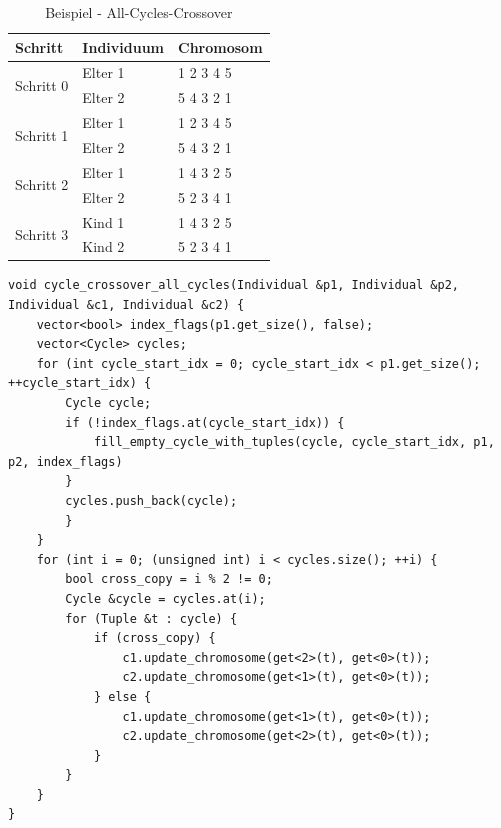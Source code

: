 \begin{table}[!htb]
\centering
\caption{Beispiel - All-Cycles-Crossover}
\begin{tabularx}{0.5\textwidth}{l|l|l}
Schritt & Individuum & Chromosom\\
\hline
\multirow{2}{*}{Schritt 0}
		& Elter 1 & 1 2 3 4 5\\
		& Elter 2 & 5 4 3 2 1\\
\hline
\multirow{2}{*}{Schritt 1}
		& Elter 1 & \color{green}1 \color{blue}2 \color{red}3 \color{blue}4 \color{green}5\\
		& Elter 2 &  \color{green}5 \color{blue}4 \color{red}3 \color{blue}2 \color{green}1\\
\hline
\multirow{2}{*}{Schritt 2}
		& Elter 1 & \color{green}1 \color{blue}4 \color{red}3 \color{blue}2 \color{green}5\\
		& Elter 2 &  \color{green}5 \color{blue}2 \color{red}3 \color{blue}4 \color{green}1\\
\hline
\multirow{2}{*}{Schritt 3}
		& Kind 1 & 1 4 3 2 5\\
		& Kind 2 & 5 2 3 4 1\\
\end{tabularx}
\label{tab:cxa}
\end{table}

\begin{minipage}[!htb]{\linewidth}
\begin{lstlisting}[caption={All-Cycles-Crossover}, firstnumber=1, captionpos=b, label=lst:cxa]
void cycle_crossover_all_cycles(Individual &p1, Individual &p2, Individual &c1, Individual &c2) {
	vector<bool> index_flags(p1.get_size(), false);
	vector<Cycle> cycles;
	for (int cycle_start_idx = 0; cycle_start_idx < p1.get_size(); ++cycle_start_idx) {
		Cycle cycle;
		if (!index_flags.at(cycle_start_idx)) {
			fill_empty_cycle_with_tuples(cycle, cycle_start_idx, p1, p2, index_flags)
		}
		cycles.push_back(cycle);
		}
	}
	for (int i = 0; (unsigned int) i < cycles.size(); ++i) {
		bool cross_copy = i % 2 != 0;
		Cycle &cycle = cycles.at(i);
		for (Tuple &t : cycle) {
			if (cross_copy) {
				c1.update_chromosome(get<2>(t), get<0>(t));
				c2.update_chromosome(get<1>(t), get<0>(t));
			} else {
				c1.update_chromosome(get<1>(t), get<0>(t));	
 				c2.update_chromosome(get<2>(t), get<0>(t));
			}
		}
	}
}

\end{lstlisting}
\end{minipage}
